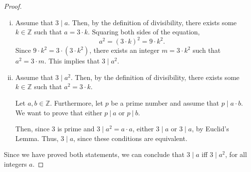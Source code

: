 \documentclass{article}
\begin{document}
\begin{enumerate}
\begin{proof}
                    \begin{enumerate}[i.]
                        \item Assume that $3 \mid a$. Then, by the definition of divisibility, there exists some $k\in\mathbb{Z}$ such that $a = 3\cdot k$. Squaring both sides of the equation,
                            \[
                                a^2 = (3\cdot k)^2 = 9\cdot k^2.
                            \]
                        \ppar Since $9\cdot k^2 = 3\cdot(3\cdot k^2)$, there exists an integer $m = 3\cdot k^2$ such that $a^2 = 3\cdot m$. This implies that $3 \mid a^2$. \\
                        \item Assume that $3 \mid a^2$. Then, by the definition of divisibility, there exists some $k\in\mathbb{Z}$ such that $a^2 = 3\cdot k$.
                            \begin{subproof}
                                Let $a,b\in\mathbb{Z}$. Furthermore, let $p$ be a prime number and assume that $p \mid a\cdot b$. We want to prove that either $p\ | \ a$ or $p\ | \ b$.
                                \begin{caseof}
                                \end{caseof}
                            \end{subproof}
                        Then, since $3$ is prime and $3 \mid a^2 = a\cdot a$, either $3 \mid a$ or $3 \mid a$, by Euclid's Lemma. Thus, $3 \mid a$, since these conditions are equivalent. 
                    
                    \end{enumerate}
                    Since we have proved both statements, we can conclude that $3 \mid a$ iff $3 \mid a^2$, for all integers $a$.
                \end{proof}


\end{enumerate}
\end{document}
